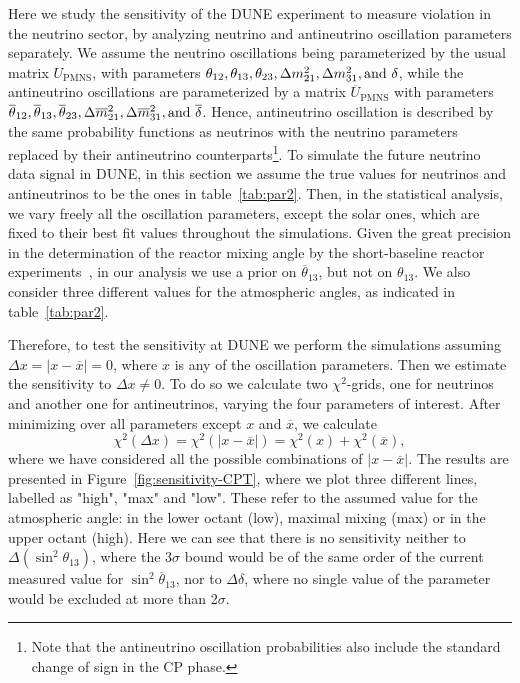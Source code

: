 Here we study the sensitivity of the DUNE experiment to measure  violation in the neutrino sector, by analyzing neutrino and antineutrino oscillation parameters separately. We assume the neutrino oscillations being parameterized by the usual  matrix $U_{\text{PMNS}}$, with parameters $\theta_{12},\theta_{13},\theta_{23},\Delta m_{21}^2,\Delta m_{31}^2, {\rm and}~\delta$, while the antineutrino oscillations are parameterized by a matrix $\overline{U}_{\text{PMNS}}$ with parameters $\overline{\theta}_{12},\overline{\theta}_{13},\overline{\theta}_{23},\Delta \overline{m}_{21}^2,\Delta \overline{m}_{31}^2, {\rm and}~\overline{\delta}$. Hence, antineutrino oscillation is described  by the same probability functions as neutrinos with the neutrino parameters replaced by their antineutrino counterparts\footnote{Note that the antineutrino oscillation probabilities also include the standard change of sign in the CP phase.}. 
To simulate the future neutrino data signal in DUNE, in this section we assume the true values for neutrinos and antineutrinos to be the ones in table~\ref{tab:par2}.
Then, in the statistical analysis, we vary freely all the oscillation parameters, except the solar ones, which are fixed to their best fit values throughout the simulations. Given the great precision in the determination of the reactor mixing angle by the short-baseline reactor experiments~\cite{An:2016ses,RENO:2015ksa,Abe:2014bwa}, in our analysis we use a prior on $\overline{\theta}_{13}$, but not on $\theta_{13}$. We also consider three different values for the atmospheric angles, as indicated in table~\ref{tab:par2}. 

Therefore, to test the sensitivity at DUNE we perform the simulations assuming $\Delta x = |x-\overline{x}| = 0$, where $x$ is any of the oscillation parameters. Then we estimate the sensitivity to $\Delta x\neq 0$. To do so we calculate two $\chi^2$-grids, one for neutrinos and another one for antineutrinos, varying the four parameters of interest. After minimizing over all parameters except $x$ and $\overline{x}$, we calculate 
%
\begin{equation}
 \chi^2(\Delta x) = \chi^2(|x-\overline{x}|) = \chi^2(x)+\chi^2(\overline{x}),
 \label{eq:chi2-nu-nubar}
\end{equation}
%
where we have considered all the possible combinations of $|x-\overline{x}|$. The results are presented in Figure~\ref{fig:sensitivity-CPT}, where we plot three different lines, labelled as "high", "max" and "low". These refer to the assumed value for the atmospheric angle: in the lower octant (low), maximal mixing (max) or in the upper octant (high). Here we can see that there is no sensitivity neither to $\Delta(\sin^2\theta_{13})$, where the 3$\sigma$ bound would be of the same order of the current measured value for $\sin^2\overline{\theta}_{13}$, nor to $\Delta\delta$, where no single value of the parameter would be excluded at more than 2$\sigma$.

